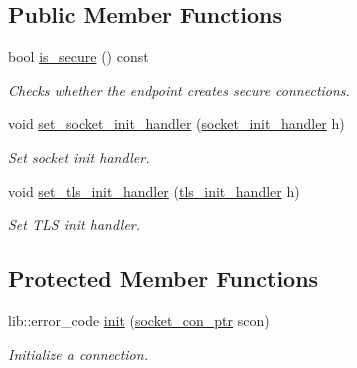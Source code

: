 \subsection*{Public Member Functions}
\begin{DoxyCompactItemize}
\item 
bool \hyperlink{classwebsocketpp_1_1transport_1_1asio_1_1tls__socket_1_1endpoint_aaaf0047506bbbd83d2da026970fc3bf8}{is\+\_\+secure} () const
\begin{DoxyCompactList}\small\item\em Checks whether the endpoint creates secure connections. \end{DoxyCompactList}\item 
void \hyperlink{classwebsocketpp_1_1transport_1_1asio_1_1tls__socket_1_1endpoint_ae9466b3c3169eb1757ca64a1462ac86e}{set\+\_\+socket\+\_\+init\+\_\+handler} (\hyperlink{namespacewebsocketpp_1_1transport_1_1asio_1_1tls__socket_a1d7e715c2f7c5fc7add88d6a37724abb}{socket\+\_\+init\+\_\+handler} h)
\begin{DoxyCompactList}\small\item\em Set socket init handler. \end{DoxyCompactList}\item 
void \hyperlink{classwebsocketpp_1_1transport_1_1asio_1_1tls__socket_1_1endpoint_aaa8973ceabe2423f535f6cfd2f7cbd53}{set\+\_\+tls\+\_\+init\+\_\+handler} (\hyperlink{namespacewebsocketpp_1_1transport_1_1asio_1_1tls__socket_a8213f20abc47626ab3bf8db285fff3b3}{tls\+\_\+init\+\_\+handler} h)
\begin{DoxyCompactList}\small\item\em Set T\+LS init handler. \end{DoxyCompactList}\end{DoxyCompactItemize}
\subsection*{Protected Member Functions}
\begin{DoxyCompactItemize}
\item 
lib\+::error\+\_\+code \hyperlink{classwebsocketpp_1_1transport_1_1asio_1_1tls__socket_1_1endpoint_a3fcd99c817947b9e23f0438c976edc64}{init} (\hyperlink{classwebsocketpp_1_1transport_1_1asio_1_1tls__socket_1_1endpoint_ad0babd14e53524633840467d072710c3}{socket\+\_\+con\+\_\+ptr} scon)
\begin{DoxyCompactList}\small\item\em Initialize a connection. \end{DoxyCompactList}\end{DoxyCompactItemize}


